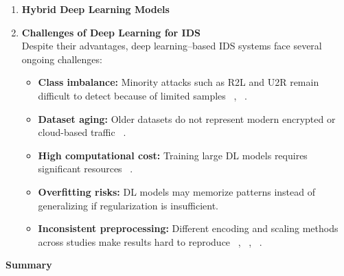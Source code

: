 \begin{enumerate}
\textbf{Key strengths:}
\lipsum[2]

Research findings show that CNNs:
\lipsum[2]
Overall, CNNs have become a leading choice for multiclass intrusion detection.

\item \textbf{Hybrid Deep Learning Models}\\
\lipsum[2]

\item \textbf{Challenges of Deep Learning for IDS}\\
Despite their advantages, deep learning–based IDS systems face several ongoing challenges:
\begin{itemize}
\item \textbf{Class imbalance:} Minority attacks such as R2L and U2R remain difficult to detect because of limited samples ~\cite{li2017intrusion}, ~\cite{al2014machine}.
\item \textbf{Dataset aging:} Older datasets do not represent modern encrypted or cloud-based traffic ~\cite{da2019internet}.
\item \textbf{High computational cost:} Training large DL models requires significant resources ~\cite{khan2021hcrnnids}.
\item \textbf{Overfitting risks:} DL models may memorize patterns instead of generalizing if regularization is insufficient.
\item \textbf{Inconsistent preprocessing:} Different encoding and scaling methods across studies make results hard to reproduce ~\cite{zamani2013machine}, ~\cite{alkasassbeh2018machine}, ~\cite{ramya2020network}.
\end{itemize}

\end{enumerate}

\textbf{Summary}\\
\lipsum[2]

